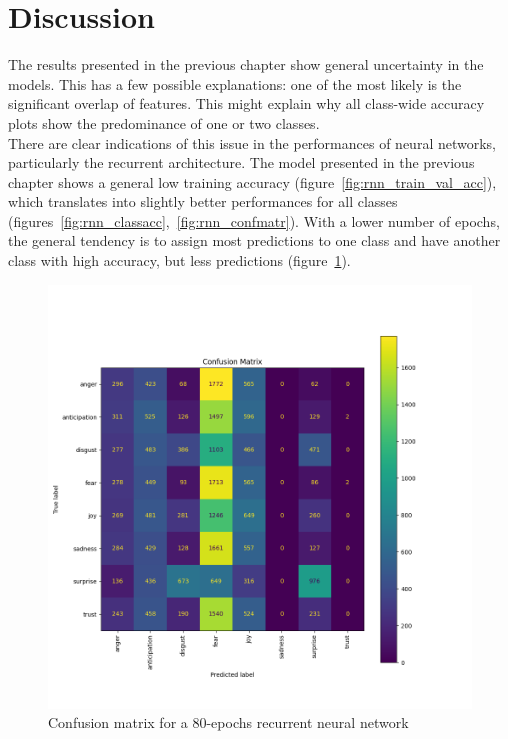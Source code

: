 \chapter*{Discussion}
\label{ch:discussion}
The results presented in the previous chapter show general
uncertainty in the models. This has a few possible explanations:
one of the most likely is the significant overlap of features. This
might explain why all class-wide accuracy plots show the predominance of one
or two classes.\\

There are clear indications of this issue in the performances of neural networks,
particularly the recurrent architecture.
The model presented in the previous chapter shows a general low training accuracy
(figure~\ref{fig:rnn_train_val_acc}), which translates into slightly better
performances for all classes (figures~\ref{fig:rnn_classacc},~\ref{fig:rnn_confmatr}).
With a lower number of epochs, the general tendency is to assign most predictions
to one class and have another class with high accuracy, but less predictions
(figure~\ref{fig:rnn_confmatr80}).
\begin{figure}[H]
    \centering
    \includegraphics[scale= 0.55]{pictures/rnn_confusion_matrix_80_epochs.png}
    \caption{Confusion matrix for a 80-epochs recurrent neural network}
    \label{fig:rnn_confmatr80}
\end{figure}
